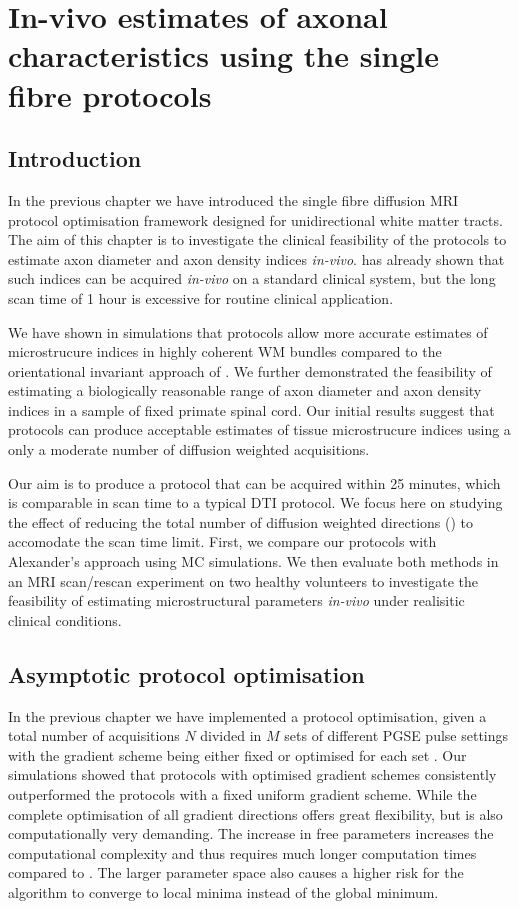 
\chapter{In-vivo estimates of axonal characteristics using the single fibre protocols}
\label{chapter 8}
\section{Introduction}
In the previous chapter we have introduced the single fibre \SF{} diffusion MRI protocol optimisation framework designed for unidirectional white matter tracts. The aim of this chapter is to investigate the clinical feasibility of the \SF{} protocols to estimate axon diameter and axon density indices \emph{in-vivo}.  has already shown that such indices can be acquired \emph{in-vivo} on a standard clinical system, but the long scan time of 1 hour is excessive for routine clinical application.  


We have shown in simulations that \SF{} protocols allow more accurate estimates of microstrucure indices in highly coherent WM bundles compared to the orientational invariant \OI{} approach of \citep{Alexander:2008}. We further demonstrated the feasibility of estimating a biologically reasonable range of axon diameter and axon density indices in a sample of fixed primate spinal cord. Our initial results suggest that \SF{} protocols can produce acceptable estimates of tissue microstrucure indices using a only a moderate number of diffusion weighted acquisitions. 

Our aim is to produce a \SF{} protocol that can be acquired within 25 minutes, which is comparable in scan time to a typical DTI protocol. We focus here on studying the effect of reducing the total number of diffusion weighted directions (\SF{}) to accomodate the scan time limit. First, we compare our \SF{} protocols with Alexander's \OI{} approach using \gls{MC} simulations. We then evaluate both methods in an MRI scan/rescan experiment on two healthy volunteers to investigate the feasibility of estimating microstructural parameters \emph{in-vivo} under realisitic clinical conditions.

\section{Asymptotic protocol optimisation}
In the previous chapter we have implemented a \SF{} protocol optimisation, given a total number of acquisitions $N$ divided in $M$ sets of different {\gls{PGSE}} pulse settings with the gradient scheme being either fixed {\OI} or optimised  for each set {\FD}. Our simulations showed that protocols with optimised gradient schemes consistently outperformed the protocols with a fixed uniform gradient scheme. While the complete optimisation of all gradient directions offers great flexibility, but is also computationally very demanding. The increase in free parameters increases the computational complexity and thus requires much longer computation times compared to {\OI}. The larger parameter space also causes a higher risk for the algorithm to converge to local minima instead of the global minimum. 

